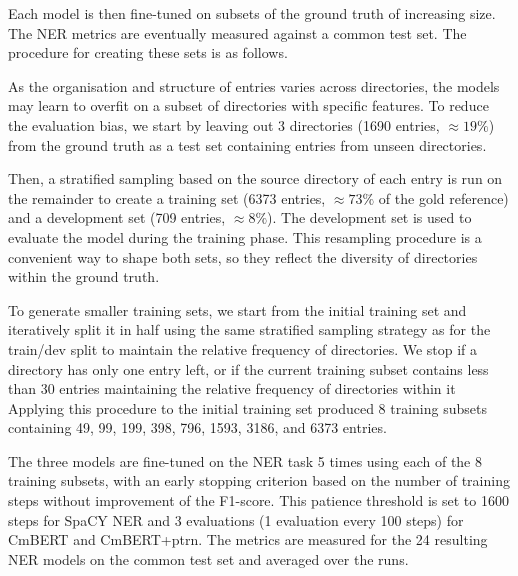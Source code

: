 Each model is then fine-tuned on subsets of the ground truth of increasing size.
The NER metrics are eventually measured against a common test set.
The procedure for creating these sets is as follows. 

As the organisation and structure of entries varies across directories, the models may learn to overfit on a subset of directories with specific features. 
To reduce the evaluation bias, we start by leaving out 3 directories (1690 entries, $\approx 19\%$) from the ground truth as a test set containing entries from unseen directories.

Then, a stratified sampling based on the source directory of each entry is run on the remainder to create a training set (6373 entries, $\approx 73\%$ of the gold reference) and a development set (709 entries, $\approx 8\%$).
The development set is used to evaluate the model during the training phase.
This resampling procedure is a convenient way to shape both sets, so they reflect the diversity of directories within the ground truth.

To generate smaller training sets, we start from the initial training set and iteratively split it in half using the same stratified sampling strategy as for the train/dev split to maintain the relative frequency of directories. 
We stop if a directory has only one entry left, or if the current training subset contains less than 30 entries maintaining the relative frequency of directories within it
Applying this procedure to the initial training set produced 8 training subsets containing 49, 99, 199, 398, 796, 1593, 3186, and 6373 entries.

The three models are fine-tuned on the NER task 5 times using each of the 8 training subsets, with an early stopping criterion based on the number of training steps without improvement of the F1-score. 
This patience threshold is set to 1600 steps for SpaCY NER and 3 evaluations (1 evaluation every 100 steps) for CmBERT and CmBERT+ptrn.
The metrics are measured for the 24 resulting NER models on the common test set and averaged over the runs.





